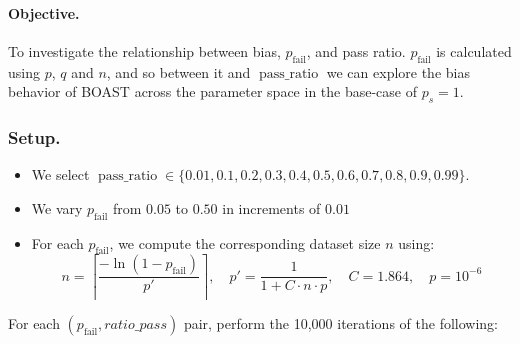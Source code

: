     \paragraph{Objective.}
    To investigate the relationship between bias, $p_\text{fail}$, and pass ratio.
    $p_\text{fail}$ is calculated using $p$, $q$ and $n$, and so between it and $\operatorname{pass\_ratio}$ we can explore the bias behavior of BOAST across the parameter space in the base-case of $p_s = 1$.

    \subsubsection{Setup.}

    \begin{itemize}
        \item We select $\operatorname{pass\_ratio} \in \{0.01, 0.1, 0.2, 0.3, 0.4, 0.5, 0.6, 0.7, 0.8, 0.9, 0.99\}$.
        \item We vary $p_\text{fail}$ from $0.05$ to $0.50$ in increments of $0.01$
        \item For each $p_\text{fail}$, we compute the corresponding dataset size $n$ using:
        \[
            n = \left\lceil \frac{-\ln(1 - p_\text{fail})}{p'} \right\rceil,
            \quad p' = \frac{1}{1 + C \cdot n \cdot p},
            \quad C = 1.864, \quad p = 10^{-6}
        \]
    \end{itemize}

    For each $(p_\text{fail}, ratio\_pass)$ pair, perform the 10,000 iterations of the following:

